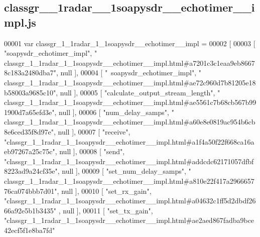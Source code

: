 \subsection{classgr\+\_\+\_\+1radar\+\_\+\_\+1soapysdr\+\_\+\+\_\+echotimer\+\_\+\+\_\+impl.\+js}
\label{classgr__1__1radar__1__1soapysdr____echotimer____impl_8js_source}

\begin{DoxyCode}
00001 var classgr_1_1radar_1_1soapysdr__echotimer__impl =
00002 [
00003     [ \textcolor{stringliteral}{"soapysdr\_echotimer\_impl"}, \textcolor{stringliteral}{"
      classgr\_1\_1radar\_1\_1soapysdr\_\_echotimer\_\_impl.html#a7201c3c1eaa9eb86678c183a2480dba7"}, null ],
00004     [ \textcolor{stringliteral}{"~soapysdr\_echotimer\_impl"}, \textcolor{stringliteral}{"
      classgr\_1\_1radar\_1\_1soapysdr\_\_echotimer\_\_impl.html#ae72c960d7b81205e18b58003a9685c10"}, null ],
00005     [ \textcolor{stringliteral}{"calculate\_output\_stream\_length"}, \textcolor{stringliteral}{"
      classgr\_1\_1radar\_1\_1soapysdr\_\_echotimer\_\_impl.html#ae5561c7b68cb567b991900d7a65efd3e"}, null ],
00006     [ \textcolor{stringliteral}{"num\_delay\_samps"}, \textcolor{stringliteral}{"
      classgr\_1\_1radar\_1\_1soapysdr\_\_echotimer\_\_impl.html#a60e8e0819ac954b6cb8e6ced35f8d97e"}, null ],
00007     [ \textcolor{stringliteral}{"receive"}, \textcolor{stringliteral}{"classgr\_1\_1radar\_1\_1soapysdr\_\_echotimer\_\_impl.html#a1f4a50f22f668ca16aeb97267a25c75c"}, 
      null ],
00008     [ \textcolor{stringliteral}{"send"}, \textcolor{stringliteral}{"classgr\_1\_1radar\_1\_1soapysdr\_\_echotimer\_\_impl.html#addcdc62171057dfbf8223ad9a24cf35e"}, null 
      ],
00009     [ \textcolor{stringliteral}{"set\_num\_delay\_samps"}, \textcolor{stringliteral}{"
      classgr\_1\_1radar\_1\_1soapysdr\_\_echotimer\_\_impl.html#a810e22f417a296665776ca074bbb7d01"}, null ],
00010     [ \textcolor{stringliteral}{"set\_rx\_gain"}, \textcolor{stringliteral}{"classgr\_1\_1radar\_1\_1soapysdr\_\_echotimer\_\_impl.html#a04632c1ff5d2dbdf2666a92e5b1b3435"}
      , null ],
00011     [ \textcolor{stringliteral}{"set\_tx\_gain"}, \textcolor{stringliteral}{"classgr\_1\_1radar\_1\_1soapysdr\_\_echotimer\_\_impl.html#ae2aed867fadba9bce42ecf5f1e8ba7fd"}

\end{DoxyCode}
